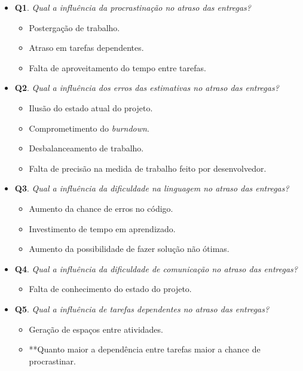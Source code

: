 	\begin{itemize}

	 \item \textbf{Q1}. \textit{Qual a influência da procrastinação no atraso das entregas?}
	 	\begin{itemize}
			\item Postergação de trabalho.
			\item Atraso em tarefas dependentes.
			\item Falta de aproveitamento do tempo entre tarefas.
		\end{itemize}

	 \item \textbf{Q2}. \textit{Qual a influência dos erros das estimativas no atraso das entregas?}
	 	\begin{itemize}
			\item Ilusão do estado atual do projeto.
			\item Comprometimento do \textit{burndown}.
			\item Desbalanceamento de trabalho.
			\item Falta de precisão na medida de trabalho feito por desenvolvedor.
		\end{itemize}

	 \item \textbf{Q3}. \textit{Qual a influência da dificuldade na linguagem no atraso das entregas?}
	 	\begin{itemize}
			\item Aumento da chance de erros no código.
			\item Investimento de tempo em aprendizado.
			\item Aumento da possibilidade de fazer solução não ótimas.
		\end{itemize}

	 \item \textbf{Q4}. \textit{Qual a influência da dificuldade de comunicação no atraso das entregas?}
	 	\begin{itemize}
			\item Falta de conhecimento do estado do projeto.
		\end{itemize}

	 \item \textbf{Q5}. \textit{Qual a influência de tarefas dependentes no atraso das entregas?}
	 	\begin{itemize}
			\item Geração de espaços entre atividades.
			\item **Quanto maior a dependência entre tarefas maior a chance de procrastinar.
		\end{itemize}


\end{itemize}

